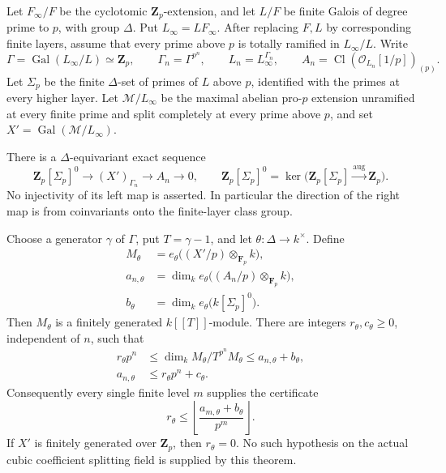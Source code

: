 \begin{theorem}
\label{thm:ACG74}
Let \(F_\infty/F\) be the cyclotomic \(\mathbf Z_p\)-extension,
and let \(L/F\) be finite Galois of degree prime to \(p\), with
group \(\Delta\).  Put \(L_\infty=LF_\infty\).
After replacing \(F,L\) by corresponding finite layers, assume
that every prime above \(p\) is totally ramified in \(L_\infty/L\).
Write
\[
 \Gamma=\operatorname{Gal}(L_\infty/L)\simeq\mathbf Z_p,\qquad
 \Gamma_n=\Gamma^{p^n},\qquad L_n=L_\infty^{\Gamma_n},\qquad
 A_n=\operatorname{Cl}(\mathcal O_{L_n}[1/p])_{(p)} .
\]
Let \(\Sigma_p\) be the finite \(\Delta\)-set of primes of \(L\)
above \(p\), identified with the primes at every higher layer.
Let \(\mathcal M/L_\infty\) be the maximal abelian pro-\(p\)
extension unramified at every finite prime and split completely
at every prime above \(p\), and set
\(X'=\operatorname{Gal}(\mathcal M/L_\infty)\).

There is a \(\Delta\)-equivariant exact sequence
\[
 \mathbf Z_p[\Sigma_p]^0
       \longrightarrow (X')_{\Gamma_n}
       \longrightarrow A_n\longrightarrow0,\qquad
 \mathbf Z_p[\Sigma_p]^0=
       \ker\bigl(\mathbf Z_p[\Sigma_p]\xrightarrow{\mathrm{aug}}
                                                   \mathbf Z_p\bigr).
                                                               \tag{G74.6}
\]
No injectivity of its left map is asserted.  In particular the
direction of the right map is from coinvariants onto the
finite-layer class group.

Choose a generator \(\gamma\) of \(\Gamma\), put \(T=\gamma-1\),
and let \(\theta:\Delta\to k^\times\).  Define
\[
 \begin{split}
 M_\theta&=e_\theta\bigl((X'/p)\otimes_{\mathbf F_p}k\bigr),\\
 a_{n,\theta}&=\dim_k e_\theta
                      \bigl((A_n/p)\otimes_{\mathbf F_p}k\bigr),\\
 b_\theta&=\dim_k e_\theta\bigl(k[\Sigma_p]^0\bigr).
 \end{split}                                                    \tag{G74.7}
\]
Then \(M_\theta\) is a finitely generated \(k[[T]]\)-module.
There are integers \(r_\theta,c_\theta\geq0\), independent of \(n\),
such that
\[
 \begin{split}
 r_\theta p^n
 &\leq \dim_k M_\theta/T^{p^n}M_\theta
 \leq a_{n,\theta}+b_\theta,\\
 a_{n,\theta}&\leq r_\theta p^n+c_\theta.
 \end{split}                                                    \tag{G74.8}
\]
Consequently every single finite level \(m\) supplies the certificate
\[
 r_\theta\leq
 \left\lfloor\frac{a_{m,\theta}+b_\theta}{p^m}\right\rfloor .
                                                               \tag{G74.9}
\]
If \(X'\) is finitely generated over \(\mathbf Z_p\), then
\(r_\theta=0\).  No such hypothesis on the actual cubic
coefficient splitting field is supplied by this theorem.
\end{theorem}

